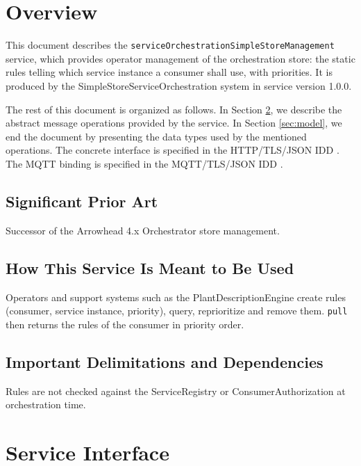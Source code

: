 \documentclass[a4paper]{arrowhead}
\begin{document}
\section{Overview}
\label{sec:overview}

This document describes the \texttt{service\allowbreak{}Orchestration\allowbreak{}Simple\allowbreak{}Store\allowbreak{}Management} service, which provides operator management of the orchestration store: the static rules telling which service instance a consumer shall use, with priorities.
It is produced by the SimpleStoreServiceOrchestration system \cite{ssso-sysd} in service version 1.0.0.

The rest of this document is organized as follows.
In Section \ref{sec:operations}, we describe the abstract message operations provided by the service.
In Section \ref{sec:model}, we end the document by presenting the data types used by the mentioned operations.
The concrete interface is specified in the HTTP/TLS/JSON IDD \cite{ssso-serviceOrchestrationSimpleStoreManagement-http-idd}. The MQTT binding is specified in the MQTT/TLS/JSON IDD \cite{ssso-serviceOrchestrationSimpleStoreManagement-mqtt-idd}.

\subsection{Significant Prior Art}

Successor of the Arrowhead 4.x Orchestrator store management.

\subsection{How This Service Is Meant to Be Used}

Operators and support systems such as the Plant\allowbreak{}Description\allowbreak{}Engine create rules (consumer, service instance, priority), query, reprioritize and remove them. \texttt{pull} then returns the rules of the consumer in priority order.

\subsection{Important Delimitations and Dependencies}
\label{sec:delimitations}

Rules are not checked against the ServiceRegistry or Consumer\allowbreak{}Authorization at orchestration time.

\newpage

\section{Service Interface}
\label{sec:operations}
\end{document}
